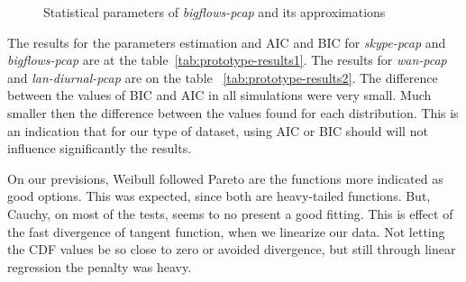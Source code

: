 \begin{figure}[ht!]
\centering
\label{fig:correlation-hurst-big-flows-pcap}
\hspace{0mm}
\caption{Statistical parameters of \textit{bigflows-pcap} and its approximations}
\end{figure}

The results for the parameters estimation and AIC and BIC for \textit{skype-pcap} and \textit{bigflows-pcap} are at the table~\ref{tab:prototype-results1}.  The results for \textit{wan-pcap} and \textit{lan-diurnal-pcap} are on the table ~\ref{tab:prototype-results2}. The difference between the values of BIC and AIC in all simulations were very small. Much smaller then the difference between the values found for each distribution. This is an indication that for our type of dataset, using AIC or BIC should will not influence significantly the results. 

On our previsions, Weibull followed Pareto are the functions more indicated as good options. This was expected, since both are heavy-tailed functions. But, Cauchy, on most of the tests, seems to no present a good fitting. This is effect of the fast divergence of tangent function, when we linearize our data. Not letting the CDF values be so close to zero or avoided divergence, but still through linear regression the penalty was heavy. 


